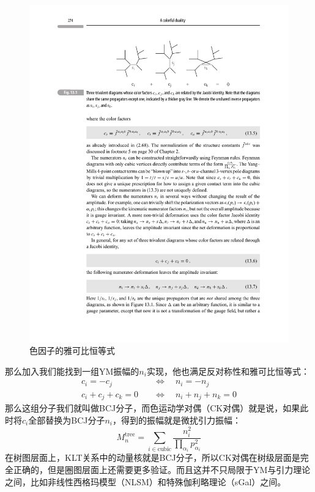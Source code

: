 \documentclass[type = bachelor]{whu-proposal}  %
\begin{document}
\begin{figure}
	\centering
	\includegraphics[width=0.85\linewidth]{figures/3.pdf}
	\caption{色因子的雅可比恒等式}
	\label{fig:3}
\end{figure}

那么加入我们能找到一组YM振幅的$n_i$实现，他也满足反对称性和雅可比恒等式：
\begin{equation}
\begin{aligned}
	c_i=-c_j\quad&\Leftrightarrow\quad n_i=-n_j\\
	c_i+c_j+c_k=0\quad&\Leftrightarrow\quad n_i+n_j+n_k=0
\end{aligned}
\end{equation}
那么这组分子我们就叫做BCJ分子，而色运动学对偶（CK对偶）就是说，如果此时将$c_i$全部替换为BCJ分子$n_i$，得到的振幅就是微扰引力振幅：\cite{Elvang:2015rqa}
\begin{equation}
	M_n^\mathrm{tree}=\sum_{i\in\mathrm{cubic}}\frac{n_i^2}{\prod_{\alpha_i}p_{\alpha_i}^2}
\end{equation}
在树图层面上，KLT关系中的动量核就是BCJ分子，所以CK对偶在树级层面是完全正确的，但是圈图层面上还需要更多验证。而且这并不只局限于YM与引力理论之间，比如非线性西格玛模型（NLSM）和特殊伽利略理论（sGal）之间。
\end{document}
